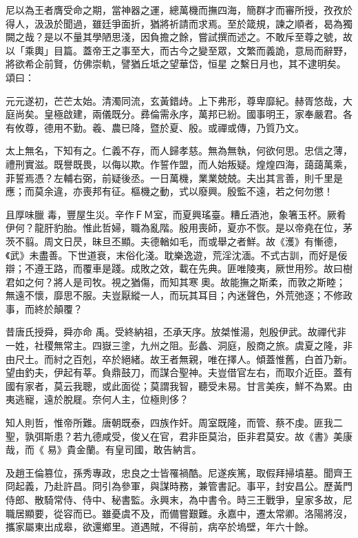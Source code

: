 \begin{pinyinscope}
 尼以為王者膺受命之期，當神器之運，總萬機而撫四海，簡群才而審所授，孜孜於得人，汲汲於聞過，雖廷爭面折，猶將祈請而求焉。至於箴規，諫之順者，曷為獨闕之哉？是以不量其學陋思淺，因負擔之餘，嘗試撰而述之。不敢斥至尊之號，故以「乘輿」目篇。蓋帝王之事至大，而古今之變至眾，文繁而義詭，意局而辭野，將欲希企前賢，仿佛崇軌，譬猶丘坻之望華岱，恒星
 之繫日月也，其不逮明矣。頌曰：



 元元遂初，芒芒太始。清濁同流，玄黃錯歭。上下弗形，尊卑靡紀。赫胥悠哉，大庭尚矣。皇極啟建，兩儀既分。彞倫需永序，萬邦已紛。國事明王，家奉嚴君。各有攸尊，德用不勤。羲、農已降，暨於夏、殷。或禪或傳，乃質乃文。



 太上無名，下知有之。仁義不存，而人歸孝慈。無為無執，何欲何思。忠信之薄，禮刑實滋。既譽既畏，以侮以欺。作誓作盟，而人始叛疑。煌煌四海，藹藹萬乘，菲誓焉憑？左輔右弼，前疑後丞。一日萬機，業業兢兢。夫出其言善，則千里是應；而莫余違，亦喪邦有征。樞機之動，式以廢興。殷監不遠，若之何勿懲！



 且厚味臘
 毒，豐屋生災。辛作ＦＭ室，而夏興瑤臺。糟丘酒池，象箸玉杯。厥肴伊何？龍肝豹胎。惟此哲婦，職為亂階。殷用喪師，夏亦不恢。是以帝堯在位，茅茨不翦。周文日昃，昧旦丕顯。夫德輶如毛，而或舉之者鮮。故《濩》有慚德，《武》未盡善。下世道衰，末俗化淺。耽樂逸遊，荒淫沈湎。不式古訓，而好是佞辯；不遵王路，而覆車是踐。成敗之效，載在先典。匪唯陵夷，厥世用殄。故曰樹君如之何？將人是司牧。視之猶傷，而知其寒奧。故能撫之斯柔，而敦之斯睦；無遠不懷，靡思不服。夫豈厭縱一人，而玩其耳目；內迷聲色，外荒弛逐；不修政事，而終於顛覆？



 昔唐氏授舜，舜亦命
 禹。受終納祖，丕承天序。放桀惟湯，剋殷伊武。故禪代非一姓，社稷無常主。四嶽三塗，九州之阻。彭蠡、洞庭，殷商之旅。虞夏之隆，非由尺土。而紂之百剋，卒於絕緒。故王者無親，唯在擇人。傾蓋惟舊，白首乃新。望由釣夫，伊起有莘。負鼎鼓刀，而謀合聖神。夫豈借官左右，而取介近臣。蓋有國有家者，莫云我聰，或此面從；莫謂我智，聽受未易。甘言美疾，鮮不為累。由夷逃寵，遠於脫屣。奈何人主，位極則侈？



 知人則哲，惟帝所難。唐朝既泰，四族作奸。周室既隆，而管、蔡不虔。匪我二聖，孰弭斯患？若九德咸受，俊乂在官，君非臣莫治，臣非君莫安。故《書》美康哉，而《
 易》貴金蘭。有皇司國，敢告納言。



 及趙王倫篡位，孫秀專政，忠良之士皆罹禍酷。尼遂疾篤，取假拜掃墳墓。聞齊王冏起義，乃赴許昌。冏引為參軍，與謀時務，兼管書記。事平，封安昌公。歷黃門侍郎、散騎常侍、侍中、秘書監。永興末，為中書令。時三王戰爭，皇家多故，尼職居顯要，從容而已。雖憂虞不及，而備嘗艱難。永嘉中，遷太常卿。洛陽將沒，攜家屬東出成皋，欲還鄉里。道遇賊，不得前，病卒於塢壁，年六十餘。




\end{pinyinscope}
